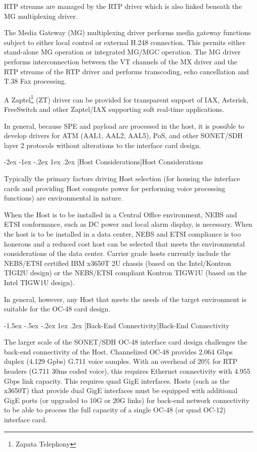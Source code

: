 \documentclass[letterpaper,final,notitlepage,twocolumn,10pt,twoside]{article}
\makeatletter
\let\large = \normalsize
\let\normalsize = \small
\let\small = \footnotesize
\let\footnotesize = \scriptsize
\let\scriptsize = \tiny
\renewcommand\section{\@startsection {section}{1}{\z@}%
                                   {-2ex \@plus -1ex \@minus -.2ex}%
                                   {1ex \@plus .2ex}%
                                   {\normalfont\large\bfseries}}
\renewcommand\subsection{\@startsection{subsection}{2}{\z@}%
                                     {-1.5ex \@plus -.5ex \@minus -.2ex}%
                                     {1ex \@plus .2ex}%
                                     {\normalfont\normalsize\bfseries}}
\makeatother
\begin{document}
RTP streams are managed by the RTP driver which is also linked beneath the MG
multiplexing driver.

The Media Gateway (MG) multiplexing driver performs media gateway functions
subject to either local control or external H.248 connection.  This permits
either stand-alone MG operation or integrated MG/MGC operation.  The MG driver
performs interconnection between the VT channels of the MX driver and the RTP
streams of the RTP driver and performs transcoding, echo cancellation and T.38
Fax processing.

A Zaptel\footnote{Zapata Telephony} (ZT) driver can be provided for transparent
support of IAX, Asterisk, FreeSwitch and other Zaptel/IAX supporting soft
real-time applications.

In general, because SPE and payload are processed in the host, it is possible to
develop drivers for ATM (AAL1, AAL2, AAL5), PoS, and other SONET/SDH layer 2
protocols without alterations to the interface card design.

\section[Host Considerations]{Host Considerations}

Typically the primary factors driving Host selection (for housing the interface
cards and providing Host compute power for performing voice processing
functions) are environmental in nature.

When the Host is to be installed in a Central Office environment, NEBS and ETSI
conformance, such as DC power and local alarm display, is necessary.  When the
host is to be installed in a data center, NEBS and ETSI compliance is too
honerous and a reduced cost host can be selected that meets the environmental
considerations of the data center.  Carrier grade hosts currently include the
NEBS/ETSI certified IBM x3650T 2U chassis (based on the Intel/Kontron TIGI2U
design) or the NEBS/ETSI compliant Kontron TIGW1U (based on the Intel TIGW1U
design).

In general, however, any Host that meets the needs of the target environment is
suitable for the OC-48 card design.

\subsection[Back-End Connectivity]{Back-End Connectivity}

The larger scale of the SONET/SDH OC-48 interface card design challenges the
back-end connectivity of the Host.  Channelized OC-48 provides 2.064 Gbps duplex
(4.129 Gpbs) G.711 voice samples.  With an overhead of 20\% for RTP headers (G.711
30ms coded voice), this requires Ethernet connectivity with 4.955 Gbps link
capacity.  This requires quad GigE interfaces.  Hosts (such as the x3650T) that
provide dual GigE interfaces must be equipped with additional GigE ports (or
upgraded to 10G or 20G links) for back-end network connectivity to be able to
process the full capacity of a single OC-48 (or quad OC-12) interface card.
\end{document}
